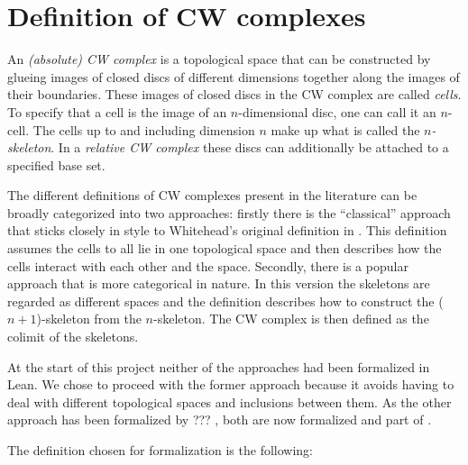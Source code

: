 \section{Definition of CW complexes}


An \emph{(absolute) CW complex} is a topological space that can be constructed by glueing images of closed discs of different dimensions together along the images of their boundaries. 
These images of closed discs in the CW complex are called \emph{cells}.
To specify that a cell is the image of an $n$-dimensional disc, one can call it an $n$-cell.
The cells up to and including dimension $n$ make up what is called the \emph{$n$-skeleton}.
In a \emph{relative CW complex} these discs can additionally be attached to a specified base set. 

The different definitions of CW complexes present in the literature can be broadly categorized into two approaches: firstly there is the ``classical'' approach that sticks closely in style to Whitehead's original definition in \cite{Whitehead2018}.
This definition assumes the cells to all lie in one topological space and then describes how the cells interact with each other and the space.
Secondly, there is a popular approach that is more categorical in nature. 
In this version the skeletons are regarded as different spaces and the definition describes how to construct the ($n+1$)-skeleton from the $n$-skeleton. 
The CW complex is then defined as the colimit of the skeletons. 

At the start of this project neither of the approaches had been formalized in Lean. 
We chose to proceed with the former approach because it avoids having to deal with different topological spaces and inclusions between them. 
As the other approach has been formalized by ??? , both are now formalized and part of \mathlib. 

The definition chosen for formalization is the following: 

